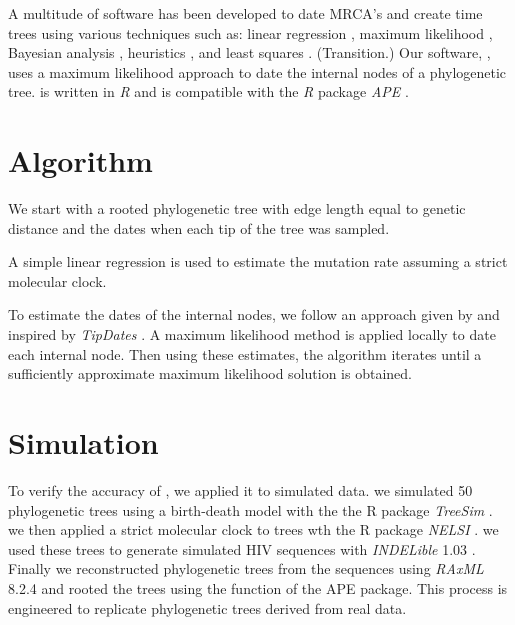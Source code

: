 \documentclass{bioinfo}
\begin{document}
A multitude of software has been developed to date MRCA's and create time trees using various techniques such as: linear regression \citep{Tempest}, maximum likelihood \citep{TipDates, r8ts, PAML}, Bayesian analysis \citep{BEAST}, heuristics \citep{UPGMA, TREBLE}, and least squares \citep{LSD}.
(Transition.)
Our software, , uses a maximum likelihood approach to date the internal nodes of a phylogenetic tree.
 is written in \emph{R} and is compatible with the \emph{R} package \emph{APE} \citep{APE}.



\section{Algorithm} \label{sec:alg}
We start with a rooted phylogenetic tree with edge length equal to genetic distance and the dates when each tip of the tree was sampled.

A simple linear regression is used to estimate the mutation rate assuming a strict molecular clock.

To estimate the dates of the internal nodes, we follow an approach given by \cite{Felsenstein81} and inspired by \emph{TipDates} \citep{TipDates}.
A maximum likelihood method is applied locally to date each internal node.
Then using these estimates, the algorithm iterates until a sufficiently approximate maximum likelihood solution is obtained.


\section{Simulation} \label{sec:sim}
To verify the accuracy of , we applied it to simulated data.
we simulated 50 phylogenetic trees using a birth-death model with the the R package \emph{TreeSim} \citep{TreeSim}.
we then applied a strict molecular clock to trees wth the R package \emph{NELSI} \citep{NELSI}.
we used these trees to generate simulated HIV sequences with \emph{INDELible} 1.03 \citep{Indelible09}.
Finally we reconstructed phylogenetic trees from the sequences using \emph{RAxML} 8.2.4 \citep{Raxml14} and rooted the trees using the  function of the APE package.
This process is engineered to replicate phylogenetic trees derived from real data.
\end{document}
